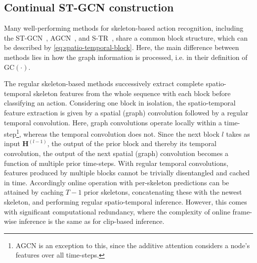 \documentclass[journal]{IEEEtran}
\theoremstyle{definition}
\begin{document}
\subsection{Continual ST-GCN construction}\label{sec:continual-st-gcn}
Many well-performing methods for skeleton-based action recognition, including the ST-GCN~\cite{yan2018spatial}, AGCN~\cite{shi2019two}, and S-TR~\cite{plizzari2021skeleton}, share a common block structure, which can be described by \cref{eq:spatio-temporal-block}.
Here, the main difference between methods lies in how the graph information is processed, i.e. in their definition of $\text{GC}(\cdot)$. 

The regular skeleton-based methods successively extract complete spatio-temporal skeleton features from the whole sequence with each block before classifying an action.
Considering one block in isolation, the spatio-temporal feature extraction is given by a spatial (graph) convolution followed by a regular temporal convolution. Here, graph convolutions operate locally within a time-step\footnote{AGCN is an exception to this, since the additive attention considers a node's features over all time-steps.},
whereas the temporal convolution does not.
Since the next block $l$ takes as input $\mathbf{H}^{(l-1)}$, the output of the prior block and thereby its temporal convolution, the output of the next spatial (graph) convolution becomes a function of multiple prior time-steps. 
With regular temporal convolutions, features produced by multiple blocks cannot be trivially disentangled and cached in time. Accordingly online operation with per-skeleton predictions can be attained by caching $T-1$ prior skeletons, concatenating these with the newest skeleton, and performing regular spatio-temporal inference. However, this comes with significant computational redundancy, where the complexity of online frame-wise inference is the same as for clip-based inference.
\end{document}
